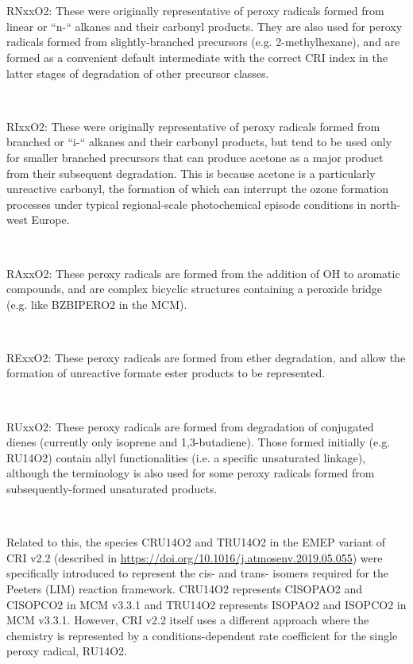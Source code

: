 {{\\}\\ \parbox{\textwidth}{
RNxxO2: These were originally representative of peroxy radicals formed from linear or “n-“ alkanes and their carbonyl products. They are also used for peroxy radicals formed from slightly-branched precursors (e.g. 2-methylhexane), and are formed as a convenient default intermediate with the correct CRI index in the latter stages of degradation of other precursor classes.
\\}\\ \parbox{\textwidth}{
RIxxO2: These were originally representative of peroxy radicals formed from branched or “i-“ alkanes and their carbonyl products, but tend to be used only for smaller branched precursors that can produce acetone as a major product from their subsequent degradation. This is because acetone is a particularly unreactive carbonyl, the formation of which can interrupt the ozone formation processes under typical regional-scale photochemical episode conditions in north-west Europe.
\\}\\ \parbox{\textwidth}{
RAxxO2: These peroxy radicals are formed from the addition of OH to aromatic compounds, and are complex bicyclic structures containing a peroxide bridge (e.g. like BZBIPERO2 in the MCM).
\\}\\ \parbox{\textwidth}{
RExxO2: These peroxy radicals are formed from ether degradation, and allow the formation of unreactive formate ester products to be represented.
\\}\\ \parbox{\textwidth}{
RUxxO2: These peroxy radicals are formed from degradation of conjugated dienes (currently only isoprene and 1,3-butadiene). Those formed initially (e.g. RU14O2) contain allyl functionalities (i.e. a specific unsaturated linkage), although the terminology is also used for some peroxy radicals formed from subsequently-formed unsaturated products.
\\}\\ \parbox{\textwidth}{
Related to this, the species CRU14O2 and TRU14O2 in the EMEP variant of CRI v2.2 (described in \url{https://doi.org/10.1016/j.atmosenv.2019.05.055}) were specifically introduced to represent the cis- and trans- isomers required for the Peeters (LIM) reaction framework. CRU14O2 represents CISOPAO2 and CISOPCO2 in MCM v3.3.1 and TRU14O2 represents ISOPAO2 and ISOPCO2 in MCM v3.3.1. However, CRI v2.2 itself uses a different approach where the chemistry is represented by a conditions-dependent rate coefficient for the single peroxy radical, RU14O2.
}}
